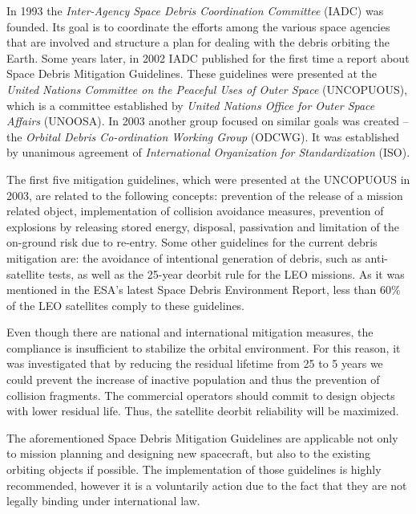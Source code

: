 In 1993 the \textit{Inter-Agency Space Debris Coordination Committee} (IADC) was founded. Its goal is to coordinate the efforts among the various space agencies that are involved and structure a plan for dealing with the debris orbiting the Earth. Some years later, in 2002 IADC published for the first time a report about Space Debris Mitigation Guidelines. \cite{UNOOSA} %
These guidelines were presented at the \textit{United Nations Committee on the Peaceful Uses of Outer Space} (UNCOPUOUS), which is a committee established by \textit{United Nations Office for Outer Space Affairs} (UNOOSA). \cite{IADC 2007} In 2003 another group focused on similar goals was created – the \textit{Orbital Debris Co-ordination Working Group} (ODCWG). It was established by unanimous agreement of \textit{International Organization for Standardization} (ISO). \cite{Klinkrad 2006}

The first five mitigation guidelines, which were presented at the UNCOPUOUS in 2003, are related to the following concepts: prevention of the release of a mission related object, implementation of collision avoidance measures, prevention of explosions by releasing stored energy, disposal, passivation and limitation of the on-ground risk due to re-entry. Some other guidelines for the current debris mitigation are: the avoidance of intentional generation of debris, such as anti-satellite tests, as well as the 25-year deorbit rule for the LEO missions. As it was mentioned in the ESA's latest Space Debris Environment Report, less than 60\% of the LEO satellites comply to these guidelines. \cite{ESA 2020} %

Even though there are national and international mitigation measures, the compliance is insufficient to stabilize the orbital environment. For this reason, it was investigated that by reducing the residual lifetime from 25 to 5 years we could prevent the increase of inactive population and thus the prevention of collision fragments. The commercial operators should commit to design objects with lower residual life. Thus, the satellite deorbit reliability will be maximized. \cite{Somma 2019}

The aforementioned Space Debris Mitigation Guidelines are applicable not only to mission planning and designing new spacecraft, but also to the existing orbiting objects if possible. The implementation of those guidelines is highly recommended, however it is a voluntarily action due to the fact that they are not legally binding under international law. \cite{UNOOSA}

